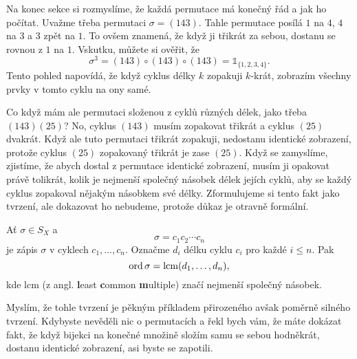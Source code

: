 Na konec sekce si rozmyslíme, že každá permutace má konečný řád a jak ho
počítat. Uvažme třeba permutaci $\sigma = (143)$. Tahle permutace posílá $1$ na
$4$, $4$ na $3$ a $3$ zpět na $1$. To ovšem znamená, že když ji 
třikrát za sebou, dostanu se rovnou z $1$ na $1$. Vskutku, můžete si ověřit, že
\[
 \sigma^3 = (143) \circ (143) \circ (143) = \mathds{1}_{\{1,2,3,4\}}.
\]
Tento pohled napovídá, že když cyklus délky $k$ zopakuji $k$-krát, zobrazím
všechny prvky v tomto cyklu na ony samé.

Co když mám ale permutaci složenou z cyklů různých délek, jako třeba
$(143)(25)$? No, cyklus $(143)$ musím zopakovat třikrát a cyklus $(25)$ dvakrát.
Když ale tuto permutaci třikrát zopakuji, nedostanu identické zobrazení, protože
cyklus $(25)$ zopakovaný třikrát je zase $(25)$. Když se zamyslíme, zjistíme, že
abych dostal z permutace identické zobrazení, musím ji opakovat právě tolikrát,
kolik je nejmenší společný násobek délek jejích cyklů, aby se každý cyklus
zopakoval nějakým násobkem své délky. Zformulujeme si tento fakt jako tvrzení,
ale dokazovat ho nebudeme, protože důkaz je otravně formální.

\begin{claim}
 Ať $\sigma \in S_X$ a
 \[
  \sigma = c_1c_2\cdots c_n
 \]
 je zápis $\sigma$ v cyklech $c_1,\ldots,c_n$. Označme $d_i$ délku cyklu $c_i$ 
 pro každé $i \leq n$. Pak
 \[
  \operatorname{ord} \sigma = \mathrm{lcm}(d_1,\ldots,d_n),
 \]
 kde $\mathrm{lcm}$ (z angl. \textbf{l}east \textbf{c}ommon \textbf{m}ultiple)
 značí nejmenší společný násobek.
\end{claim}

Myslím, že tohle tvrzení je pěkným příkladem přirozeného avšak poměrně silného
tvrzení. Kdybyste nevěděli nic o permutacích a řekl bych vám, že máte dokázat
fakt, že když bijekci na konečné množině složím samu se sebou hodněkrát, dostanu
identické zobrazení, asi byste se zapotili.
